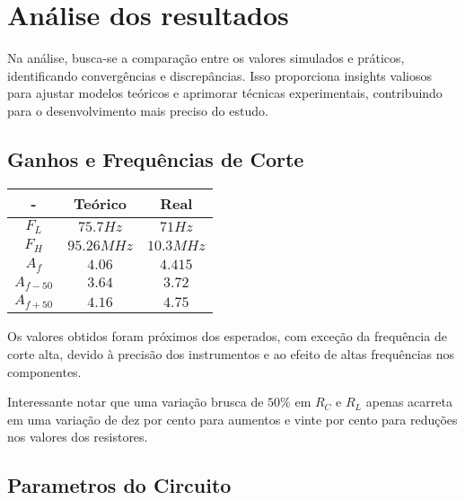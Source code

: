 \section{Análise dos resultados}

Na análise, busca-se a comparação entre os valores simulados e práticos, identificando convergências e discrepâncias. Isso proporciona insights valiosos para ajustar modelos teóricos e aprimorar técnicas experimentais, contribuindo para o desenvolvimento mais preciso do estudo.

\subsection{Ganhos e Frequências de Corte}

\begin{table}[h]
    \centering
    \begin{tabular}{|c|c|c|}
        \hline
        \textbf{-} & \textbf{Teórico} & \textbf{Real} \\
        \hline
        $F_L$      & $75.7Hz$         & $71Hz$        \\
        \hline
        $F_H$      & $95.26MHz$       & $10.3 MHz$    \\
        \hline
        $A_f$      & $4.06$           & $4.415$       \\
        \hline
        $A_{f-50}$ & $3.64$           & $3.72$        \\
        \hline
        $A_{f+50}$ & $4.16$           & $4.75$        \\
        \hline
    \end{tabular}
\end{table}

Os valores obtidos foram próximos dos esperados, com exceção da frequência de corte alta, devido à precisão dos instrumentos e ao efeito de altas frequências nos componentes.

Interessante notar que uma variação brusca de $50\%$ em $R_C$ e $R_L$ apenas acarreta em uma variação de dez por cento para aumentos e vinte por cento para reduções nos valores dos resistores.

\subsection{Parametros do Circuito}


